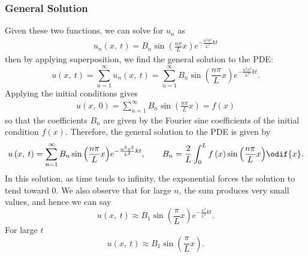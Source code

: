 \documentclass{article}
\begin{document}
\subsubsection{General Solution}
Given these two functions, we can solve for \(u_n\) as
\begin{align*}
    u_n\left( x,\: t \right) = B_n \sin{\left( \frac{n \pi}{L} x \right)} e^{-\frac{n^2 \pi^2}{L^2} k t}
\end{align*}
then by applying superposition, we find the general solution to the PDE\@:
\begin{equation*}
    u\left( x,\: t \right) = \sum_{n = 1}^\infty u_n\left( x,\: t \right) = \sum_{n = 1}^\infty B_n \sin{\left( \frac{n \pi}{L} x \right)} e^{-\frac{n^2 \pi^2}{L^2} k t}.
\end{equation*}
Applying the initial conditions gives
\begin{align*}
    u\left( x,\: 0 \right) = \sum_{n = 1}^\infty B_n \sin{\left( \frac{n \pi}{L} x \right)} = f\left( x \right)
\end{align*}
so that the coefficients \(B_n\) are given by the Fourier sine coefficients of the initial condition \(f\left( x \right)\).
Therefore, the general solution to the PDE is given by
\begin{equation*}
    u\left( x,\: t \right) = \sum_{n = 1}^\infty B_n \sin{\left( \frac{n \pi}{L} x \right)} e^{-\frac{n^2 \pi^2}{L^2} k t}, \quad \quad B_n = \frac{2}{L} \int_0^L f\left( x \right) \sin{\left( \frac{n \pi}{L} x \right)} \odif{x}.
\end{equation*}
In this solution, as time tends to infinity, the exponential forces the solution to tend toward \(0\).
We also observe that for large \(n\), the sum produces very small values, and hence we can say
\begin{equation*}
    u\left( x,\: t \right) \approx B_1 \sin{\left( \frac{\pi}{L} x \right)} e^{-\frac{\pi^2}{L^2} k t} .
\end{equation*}
For large \(t\)
\begin{equation*}
    u\left( x,\: t \right) \approx B_1 \sin{\left( \frac{\pi}{L} x \right)}.
\end{equation*}
\end{document}
